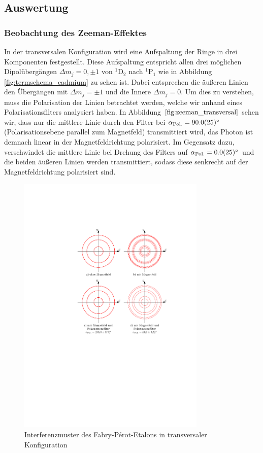 \documentclass[11pt, a4paper]{article}
\begin{document}
\subsection{Auswertung}

\subsubsection{Beobachtung des Zeeman-Effektes}
In der transversalen Konfiguration wird eine Aufspaltung der Ringe in drei Komponenten festgestellt.
Diese Aufspaltung entspricht allen drei möglichen Dipolübergängen $\Delta m_j = 0, \pm 1$ von $^1$D$_2$ nach $^1$P$_1$ wie in Abbildung \ref{fig:termschema_cadmium} zu sehen ist.
Dabei entsprechen die äußeren Linien den Übergängen mit $\Delta m_j = \pm 1$ und die Innere $\Delta m_j = 0$.
Um dies zu verstehen, muss die Polarisation der Linien betrachtet werden, welche wir anhand eines Polarisationsfilters analysiert haben.
In Abbildung $\ref{fig:zeeman_transversal}$ sehen wir, dass nur die mittlere Linie durch den Filter bei $\alpha_\mathrm{Pol.} = \SI{90 +- 2,5}{\degree}$ (Polarisationsebene parallel zum Magnetfeld) transmittiert wird,  das Photon ist demnach linear in der Magnetfeldrichtung polarisiert.
Im Gegensatz dazu, verschwindet die mittlere Linie bei Drehung des Filters auf $\alpha_\mathrm{Pol.} = \SI{0 +- 2,5}{\degree}$ und die beiden äußeren Linien werden transmittiert, sodass diese senkrecht auf der Magnetfeldrichtung polarisiert sind.
\begin{figure}[h]
	\centering
	\includegraphics[width=0.8\textwidth]{./figures/zeeman_transversal.pdf}
	\caption{Interferenzmuster des Fabry-Pérot-Etalons in transversaler Konfiguration}
	\label{fig:zeeman_transversal}
\end{figure}
\end{document}
